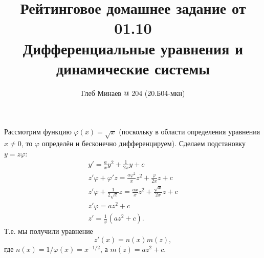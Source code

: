 \documentclass[12pt,a4paper]{article}
\title{Рейтинговое домашнее задание от 01.10\\Дифференциальные уравнения и динамические системы}
\author{Глеб Минаев @ 204 (20.Б04-мкн)}
\date{}
\begin{document}
    \maketitle

    \begin{problem}{4}
        Рассмотрим функцию $\varphi(x) = \sqrt{x}$ (поскольку в области определения уравнения $x \neq 0$, то $\varphi$ определён и бесконечно дифференцируем). Сделаем подстановку $y = z \varphi$:
        \begin{gather*}
            y' = \frac{a}{x} y^2 + \frac{1}{2x} y + c\\
            z' \varphi + \varphi' z = \frac{a \varphi^2}{x} z^2 + \frac{\varphi}{2x} z + c\\
            z' \varphi + \frac{1}{2\sqrt{x}} z = \frac{a x}{x} z^2 + \frac{\sqrt{x}}{2x} z + c\\
            z' \varphi = a z^2 + c\\
            z' = \frac{1}{\varphi}(a z^2 + c).
        \end{gather*}
        Т.е. мы получили уравнение
        \[z'(x) = n(x) m(z),\]
        где $n(x) = 1/\varphi(x) = x^{-1/2}$, а $m(z) = az^2 + c$.
    \end{problem}
\end{document}
